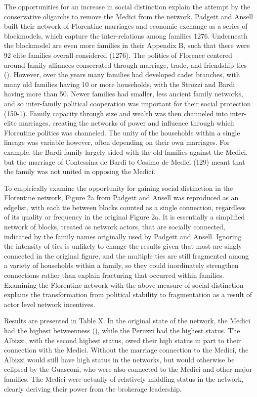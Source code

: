 \documentclass[12pt]{article}
\begin{document}
The opportunities for an increase in social distinction explain the attempt by the conservative oligarchs to remove the Medici from the network. Padgett and Ansell built their network of Florentine marriages and economic exchange as a series of blockmodels, which capture the inter-relations among families \citep{padgett1993robust} 1276. Underneath the blockmodel are even more families in their Appendix B, such that there were 92 elite families overall considered (1276). The politics of Florence centered around family alliances consecrated through marriage, trade, and friendship ties (). However, over the years many families had developed cadet branches, with many old families having 10 or more households, with the Strozzi and Bardi having more than 50. Newer families had smaller, less ancient family networks, and so inter-family political cooperation was important for their social protection (150-1). Family capacity through size and wealth was then channeled into inter-elite marriages, creating the networks of power and influence through which Florentine politics was channeled. The unity of the households within a single lineage was variable however, often depending on their own marriages. For example, the Bardi family largely sided with the old families against the Medici, but the marriage of Contessina de Bardi to Cosimo de Medici (129) meant that the family was not united in opposing the Medici. 
	
To empirically examine the opportunity for gaining social distinction in the Florentine network, Figure 2a from Padgett and Ansell was reproduced as an edgelist, with each tie between blocks counted as a single connection, regardless of its quality or frequency in the original Figure 2a. It is essentially a simplified network of blocks, treated as network actors, that are socially connected, indicated by the family names originally used by Padgett and Ansell. Ignoring the intensity of ties is unlikely to change the results given that most are singly connected in the original figure, and the multiple ties are still fragmented among a variety of households within a family, so they could inordinately strengthen connections rather than explain fracturing that occurred within families. Examining the Florentine network with the above measure of social distinction explains the transformation from political stability to fragmentation as a result of actor level network incentives.

Results are presented in Table X. In the original state of the network, the Medici had the highest betweenness (), while the Peruzzi had the highest status. The Albizzi, with the second highest status, owed their high status in part to their connection with the Medici. Without the marriage connection to the Medici, the Albizzi would still have high status in the networks, but would otherwise be eclipsed by the Guasconi, who were also connected to the Medici and other major families. The Medici were actually of relatively middling status in the network, clearly deriving their power from the brokerage leadership.         
\end{document}
